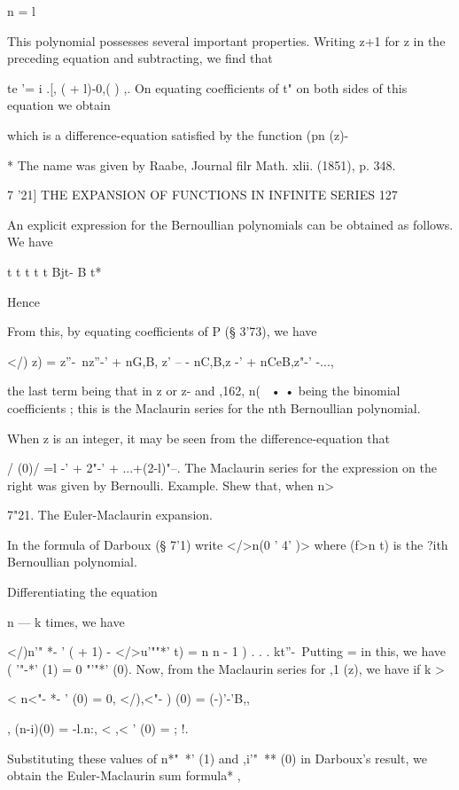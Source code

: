 n = l 



This polynomial possesses several important properties. Writing z+1 
for z in the preceding equation and subtracting, we find that 

te '= i .[,  (  + l)-0,( )  ,. 
On equating coefficients of t" on both sides of this equation we obtain 

which is a difference-equation satisfied by the function (pn (z)- 

* The name was given by Raabe, Journal filr Math. xlii. (1851), p. 348. 



7 '21] THE EXPANSION OF FUNCTIONS IN INFINITE SERIES 127 

An explicit expression for the Bernoullian polynomials can be obtained 
as follows. We have 

t t t t   t Bjt- B t* 

Hence 

From this, by equating coefficients of P (§ 3'73), we have 

</)   z) = z''-\ nz''-' + nG,B, z' -- - nC,B,z -' + nCeB,z"-' -..., 

the last term being that in z or z- and ,162, n( \, • • being the binomial 
coefficients ; this is the Maclaurin series for the nth Bernoullian polynomial. 

When z is an integer, it may be seen from the difference-equation that 

 /  (0)/ =l -' + 2"-' + ...+(2-l)"--. 
The Maclaurin series for the expression on the right was given by Bernoulli. 
Example. Shew that, when n>\, 

7"21. The Euler-Maclaurin expansion. 

In the formula of Darboux (§ 7'1) write </>n(0   ' 4'  )> where (f>n t) is the 
?ith Bernoullian polynomial. 

Differentiating the equation 

n — k times, we have 

</)n'"  *- ' (  + 1) - </>u'""*'  t) = n  n - 1 ) . . . kt''-\ 
Putting   = in this, we have (  '"-*' (1) = 0 "'"*' (0). 
Now, from the Maclaurin series for  ,1 (z), we have if k > 

< n<"- *- ' (0) = 0, </),<"- ) (0) =   (-)'-'B,, 

 , (n-i)(0) = -l.n:, < ,< ' (0) = ; !. 

Substituting these values of  n*"~*' (1) and  ,i'"~** (0) in Darboux's result, 
we obtain the Euler-Maclaurin sum formula* , 

